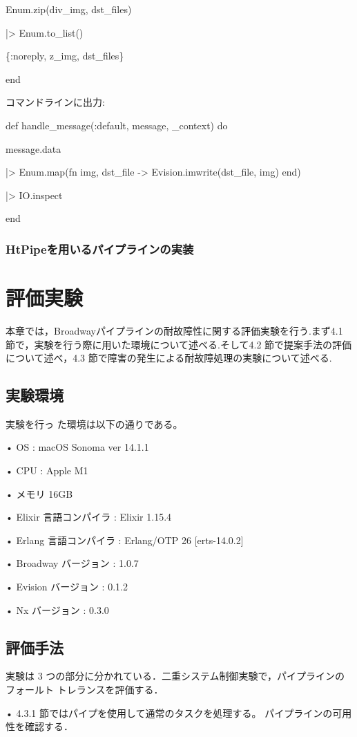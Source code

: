 \documentclass[a4paper]{jreport}	%
\begin{document}
    Enum.zip(div\_img, dst\_files)
    
    |> Enum.to\_list()
    
    \{:noreply, z\_img, dst\_files\}
  
end

コマンドラインに出力:

  def handle\_message(:default, message, \_context) do
  
    message.data
    
    |> Enum.map(fn {img, dst\_file} -> Evision.imwrite(dst\_file, img) end)
    
    |> IO.inspect
    
  end

\subsection{HtPipeを用いるパイプラインの実装}


\chapter{評価実験}
本章では，Broadwayパイプラインの耐故障性に関する評価実験を行う.まず4.1 節で，実験を行う際に用いた環境について述べる.そして4.2 節で提案手法の評価について述べ，4.3 節で障害の発生による耐故障処理の実験について述べる.
\section{実験環境}
実験を行っ た環境は以下の通りである。

• OS : macOS Sonoma ver 14.1.1 

• CPU : Apple M1

• メモリ 16GB 

• Elixir 言語コンパイラ : Elixir 1.15.4

• Erlang 言語コンパイラ : Erlang/OTP 26 [erts-14.0.2]

• Broadway バージョン :  1.0.7

• Evision バージョン :  0.1.2

• Nx バージョン :  0.3.0

\section{評価手法}
実験は 3 つの部分に分かれている．二重システム制御実験で，パイプラインのフォールト トレランスを評価する．

• 4.3.1 節ではパイプを使用して通常のタスクを処理する。 パイプラインの可用性を確認する．
\end{document}
